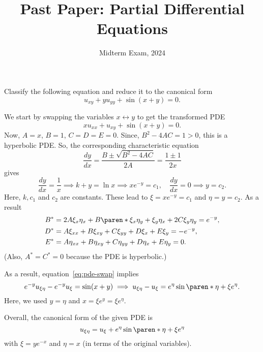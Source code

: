\documentclass[11pt]{penrose}
\title{Past Paper: Partial Differential Equations}
\subtitle{Midterm Exam, 2024}
\begin{document}
\maketitle
\warningtext

\begin{problem}{1}
    Classify the following equation and reduce it to the canonical form
    \begin{equation*}
        u_{xy} + y u_{yy} + \sin(x+y) = 0.
    \end{equation*}

    \solution We start by swapping the variables $x \leftrightarrow y$ to get the transformed PDE
    \begin{equation*}
        x u_{xx} + u_{xy} + \sin(x+y) = 0. \tag{\textasteriskcentered}\label{eq:pde-swap}
    \end{equation*}
    Now, $A = x$, $B = 1$, $C = D = E = 0$. Since, $B^2 - 4AC = 1 > 0$, this is a hyperbolic PDE. So, the corresponding characteristic equation
    \begin{equation*}
        \frac{dy}{dx} = \frac{B \pm \sqrt{B^2 - 4AC}}{2A} = \frac{1 \pm 1}{2x}
    \end{equation*}
    gives
    \begin{equation*}
        \frac{dy}{dx} = \frac{1}{x} \implies k + y = \ln x \implies x e^{-y} = c_1, \quad
        \frac{dy}{dx} = 0 \implies y = c_2.
    \end{equation*}
    Here, $k, c_1$ and $c_2$ are constants. These lead to $\xi = x e^{-y} = c_1$ and $\eta = y = c_2$. As a result
    \begin{align*}
        B^{*} &= 2A\xi_x \eta_x + B \paren*{\xi_x \eta_y + \xi_y \eta_x} + 2C \xi_y \eta_y = e^{-y},\\
        D^{*} &= A \xi_{xx} + B \xi_{xy} + C \xi_{yy} + D \xi_{x} + E \xi_{y} = -e^{-y},\\
        E^{*} &= A \eta_{xx} + B \eta_{xy} + C \eta_{yy} + D \eta_{x} + E \eta_{y} = 0.
    \end{align*}
    (Also, $A^{*} = C^{*} = 0$ because the PDE is hyperbolic.)

    As a result, equation~\eqref{eq:pde-swap} implies
    \begin{equation*}
        e^{-y} u_{\xi\eta} - e^{-y} u_{\xi} = \sin(x + y)
        \implies u_{\xi\eta} - u_{\xi} = e^{\eta}\sin\paren*{\eta + \xi e^\eta}.
    \end{equation*}
    Here, we used $y = \eta$ and $x = \xi e^y = \xi e^\eta$.

    Overall, the canonical form of the given PDE is
    \begin{equation*}
        u_{\xi\eta} = u_{\xi} + e^{\eta}\sin\paren*{\eta + \xi e^\eta}
    \end{equation*}
    with $\xi = y e^{-x}$ and $\eta = x$ (in terms of the original variables).
\end{problem}
\end{document}
